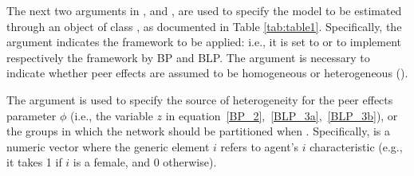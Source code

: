 \documentclass[nojss]{jss}
\begin{document}
The next two arguments in ,  and 
, are used to specify the model to be estimated
through an object of class , as documented in Table \ref{tab:table1}. Specifically, the argument  indicates the framework to be applied: i.e., it is set to  or  to implement respectively the framework by BP and BLP. The argument  is necessary to indicate whether peer effects are assumed to be homogeneous  or heterogeneous (). 

\begin{table}[t!]
\centering
{}
\caption{\label{tab:table1} Field specification in }
\end{table}

The argument  is used to specify the source of heterogeneity for the peer effects parameter $\phi$ (i.e., the variable $z$ in equation~\ref{BP_2},~\ref{BLP_3a},~\ref{BLP_3b}), or the groups in which the network should be partitioned when . Specifically,  is a numeric
vector where the generic element $i$ refers to agent's $i$ characteristic (e.g., it takes 1 if $i$ is a female, and 0 otherwise).
\end{document}
